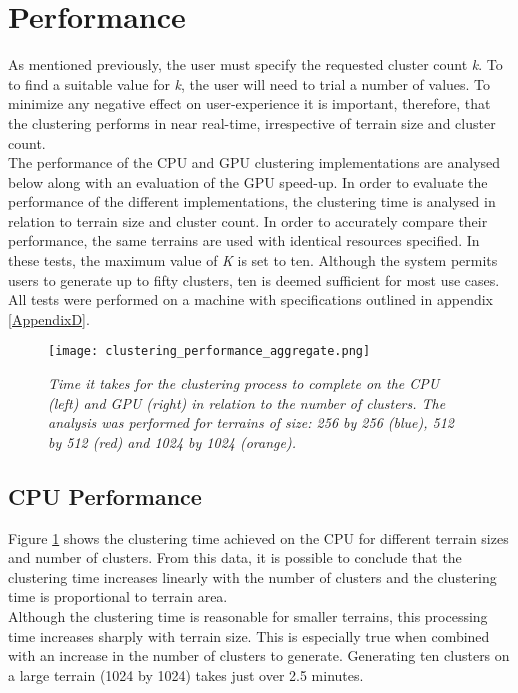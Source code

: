 \section{Performance}

As mentioned previously, the user must specify the requested cluster count \textit{k}. To to find a suitable value for \textit{k}, the user will need to trial a number of values. To minimize any negative effect on user-experience it is important, therefore, that the clustering performs in near real-time, irrespective of terrain size and cluster count.\\

The performance of the CPU and GPU clustering implementations are analysed below along with an evaluation of the GPU speed-up. In order to evaluate the performance of the different implementations, the clustering time is analysed in relation to terrain size and cluster count. In order to accurately compare their performance, the same terrains are used with identical resources specified. In these tests, the maximum value of \textit{K} is set to ten. Although the system permits users to generate up to fifty clusters, ten is deemed sufficient for most use cases. All tests were performed on a machine with specifications outlined in appendix \ref{AppendixD}.

\begin{figure}
\center
	\texttt{[image: clustering\_performance\_aggregate.png]}
	\caption{ \textit{Time it takes for the clustering process to complete on the CPU (left) and GPU (right) in relation to the number of clusters. The analysis was performed for terrains of size: 256 by 256 (blue), 512 by 512 (red) and 1024 by 1024 (orange).}}	
	\label{fig:aggregate_clustering_performance}
\end{figure}

\subsection{CPU Performance}

Figure \ref{fig:aggregate_clustering_performance} shows the clustering time achieved on the CPU for different terrain sizes and number of clusters. From this data, it is possible to conclude that the clustering time increases linearly with the number of clusters and the clustering time is proportional to terrain area.\\

Although the clustering time is reasonable for smaller terrains, this processing time increases sharply with terrain size. This is especially true when combined with an increase in the number of clusters to generate. Generating ten clusters on a large terrain (1024 by 1024) takes just over 2.5 minutes.\\

